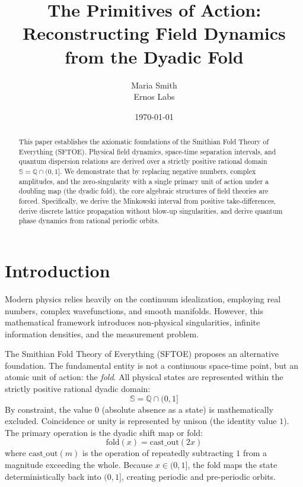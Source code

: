 \documentclass[11pt,a4paper]{article}
\title{\textbf{The Primitives of Action: Reconstructing Field Dynamics from the Dyadic Fold}}
\author{Maria Smith \\ Ernos Labs}
\date{\today}
\begin{document}
\maketitle

\begin{abstract}
This paper establishes the axiomatic foundations of the Smithian Fold Theory of Everything (SFTOE). Physical field dynamics, space-time separation intervals, and quantum dispersion relations are derived over a strictly positive rational domain $\mathbb{S} = \mathbb{Q} \cap (0, 1]$. We demonstrate that by replacing negative numbers, complex amplitudes, and the zero-singularity with a single primary unit of action under a doubling map (the dyadic fold), the core algebraic structures of field theories are forced. Specifically, we derive the Minkowski interval from positive take-differences, derive discrete lattice propagation without blow-up singularities, and derive quantum phase dynamics from rational periodic orbits.
\end{abstract}

\section{Introduction}
Modern physics relies heavily on the continuum idealization, employing real numbers, complex wavefunctions, and smooth manifolds. However, this mathematical framework introduces non-physical singularities, infinite information densities, and the measurement problem. 

The Smithian Fold Theory of Everything (SFTOE) proposes an alternative foundation. The fundamental entity is not a continuous space-time point, but an atomic unit of action: the \textit{fold}. All physical states are represented within the strictly positive rational dyadic domain:
\begin{equation}
\mathbb{S} = \mathbb{Q} \cap (0, 1]
\end{equation}
By constraint, the value $0$ (absolute absence as a state) is mathematically excluded. Coincidence or unity is represented by unison (the identity value $1$). The primary operation is the dyadic shift map or fold:
\begin{equation}
\text{fold}(x) = \text{cast\_out}(2x)
\end{equation}
where $\text{cast\_out}(m)$ is the operation of repeatedly subtracting $1$ from a magnitude exceeding the whole. Because $x \in (0, 1]$, the fold maps the state deterministically back into $(0, 1]$, creating periodic and pre-periodic orbits.
\end{document}
